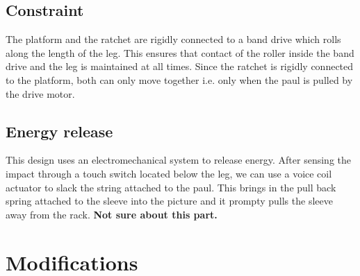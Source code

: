 \subsection{Constraint} 
The platform and the ratchet are rigidly connected to a band drive which rolls along
the length of the leg. This ensures that contact of the roller inside the band drive and the leg is maintained at all
times. Since the ratchet is rigidly connected to the platform, both can only move together i.e. only when the paul is
pulled by the drive motor. 

\subsection{Energy release}
This design uses an electromechanical system to release energy. After sensing the impact through a touch switch located
below the leg, we can use a voice coil actuator to slack the string attached to the paul. This brings in the pull
back spring attached to the sleeve into the picture and it prompty pulls the sleeve away from the rack.
\textbf{Not sure about this part.}

\section{Modifications}





